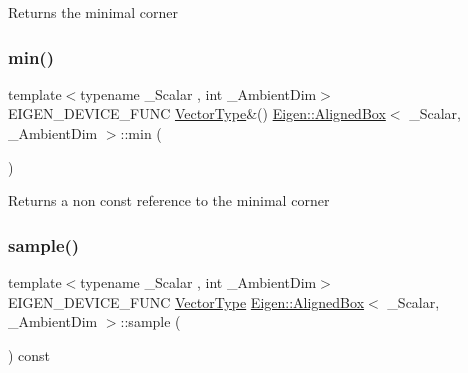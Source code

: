 \begin{DoxyReturn}{Returns}
the minimal corner 
\end{DoxyReturn}
\mbox{\label{class_eigen_1_1_aligned_box_a36f4c48fdbf74637e54422b9c386f24d}} 
\subsubsection{\texorpdfstring{min()}{min()}\hspace{0.1cm}{\footnotesize\ttfamily [2/2]}}
{\footnotesize\ttfamily template$<$typename \+\_\+\+Scalar , int \+\_\+\+Ambient\+Dim$>$ \\
E\+I\+G\+E\+N\+\_\+\+D\+E\+V\+I\+C\+E\+\_\+\+F\+U\+NC \mbox{\hyperlink{class_eigen_1_1_matrix}{Vector\+Type}}\&() \mbox{\hyperlink{class_eigen_1_1_aligned_box}{Eigen\+::\+Aligned\+Box}}$<$ \+\_\+\+Scalar, \+\_\+\+Ambient\+Dim $>$\+::min (\begin{DoxyParamCaption}{ }\end{DoxyParamCaption})\hspace{0.3cm}{\ttfamily [inline]}}

\begin{DoxyReturn}{Returns}
a non const reference to the minimal corner 
\end{DoxyReturn}
\mbox{\label{class_eigen_1_1_aligned_box_a3cd54685b5378b5e77fa2c62ca7e2797}} 
\subsubsection{\texorpdfstring{sample()}{sample()}}
{\footnotesize\ttfamily template$<$typename \+\_\+\+Scalar , int \+\_\+\+Ambient\+Dim$>$ \\
E\+I\+G\+E\+N\+\_\+\+D\+E\+V\+I\+C\+E\+\_\+\+F\+U\+NC \mbox{\hyperlink{class_eigen_1_1_matrix}{Vector\+Type}} \mbox{\hyperlink{class_eigen_1_1_aligned_box}{Eigen\+::\+Aligned\+Box}}$<$ \+\_\+\+Scalar, \+\_\+\+Ambient\+Dim $>$\+::sample (\begin{DoxyParamCaption}{ }\end{DoxyParamCaption}) const\hspace{0.3cm}{\ttfamily [inline]}}

